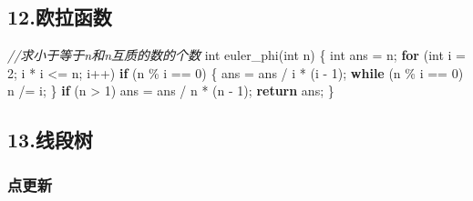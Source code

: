 \documentclass[
]{article}
\newenvironment{Shaded}{}{}
\newcommand{\CommentTok}[1]{\textcolor[rgb]{0.38,0.63,0.69}{\textit{#1}}}
\newcommand{\ControlFlowTok}[1]{\textcolor[rgb]{0.00,0.44,0.13}{\textbf{#1}}}
\newcommand{\DataTypeTok}[1]{\textcolor[rgb]{0.56,0.13,0.00}{#1}}
\newcommand{\DecValTok}[1]{\textcolor[rgb]{0.25,0.63,0.44}{#1}}
\newcommand{\NormalTok}[1]{#1}
\newcommand{\OperatorTok}[1]{\textcolor[rgb]{0.40,0.40,0.40}{#1}}
\begin{document}
\hypertarget{12ux6b27ux62c9ux51fdux6570}{%
\subsection{12.欧拉函数}\label{12ux6b27ux62c9ux51fdux6570}}

\begin{Shaded}
\begin{Highlighting}[]
\CommentTok{//求小于等于n和n互质的数的个数}
\DataTypeTok{int}\NormalTok{ euler\_phi}\OperatorTok{(}\DataTypeTok{int}\NormalTok{ n}\OperatorTok{)} \OperatorTok{\{}
  \DataTypeTok{int}\NormalTok{ ans }\OperatorTok{=}\NormalTok{ n}\OperatorTok{;}
  \ControlFlowTok{for} \OperatorTok{(}\DataTypeTok{int}\NormalTok{ i }\OperatorTok{=} \DecValTok{2}\OperatorTok{;}\NormalTok{ i }\OperatorTok{*}\NormalTok{ i }\OperatorTok{\textless{}=}\NormalTok{ n}\OperatorTok{;}\NormalTok{ i}\OperatorTok{++)}
    \ControlFlowTok{if} \OperatorTok{(}\NormalTok{n }\OperatorTok{\%}\NormalTok{ i }\OperatorTok{==} \DecValTok{0}\OperatorTok{)} \OperatorTok{\{}
\NormalTok{      ans }\OperatorTok{=}\NormalTok{ ans }\OperatorTok{/}\NormalTok{ i }\OperatorTok{*} \OperatorTok{(}\NormalTok{i }\OperatorTok{{-}} \DecValTok{1}\OperatorTok{);}
      \ControlFlowTok{while} \OperatorTok{(}\NormalTok{n }\OperatorTok{\%}\NormalTok{ i }\OperatorTok{==} \DecValTok{0}\OperatorTok{)}\NormalTok{ n }\OperatorTok{/=}\NormalTok{ i}\OperatorTok{;}
    \OperatorTok{\}}
  \ControlFlowTok{if} \OperatorTok{(}\NormalTok{n }\OperatorTok{\textgreater{}} \DecValTok{1}\OperatorTok{)}\NormalTok{ ans }\OperatorTok{=}\NormalTok{ ans }\OperatorTok{/}\NormalTok{ n }\OperatorTok{*} \OperatorTok{(}\NormalTok{n }\OperatorTok{{-}} \DecValTok{1}\OperatorTok{);}
  \ControlFlowTok{return}\NormalTok{ ans}\OperatorTok{;}
\OperatorTok{\}}
\end{Highlighting}
\end{Shaded}

\hypertarget{13ux7ebfux6bb5ux6811}{%
\subsection{13.线段树}\label{13ux7ebfux6bb5ux6811}}

\hypertarget{ux70b9ux66f4ux65b0}{%
\subsubsection{点更新}\label{ux70b9ux66f4ux65b0}}
\end{document}
